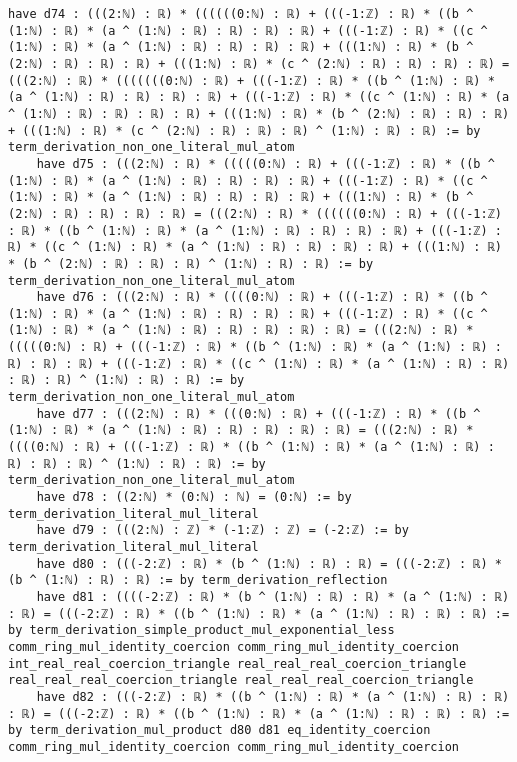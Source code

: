 \documentclass{article}
\begin{document}
\begin{tcolorbox}[colback=white!10, width=\linewidth]
\begin{lstlisting}[language=Lean4]
    have d74 : (((2:ℕ) : ℝ) * ((((((0:ℕ) : ℝ) + (((-1:ℤ) : ℝ) * ((b ^ (1:ℕ) : ℝ) * (a ^ (1:ℕ) : ℝ) : ℝ) : ℝ) : ℝ) + (((-1:ℤ) : ℝ) * ((c ^ (1:ℕ) : ℝ) * (a ^ (1:ℕ) : ℝ) : ℝ) : ℝ) : ℝ) + (((1:ℕ) : ℝ) * (b ^ (2:ℕ) : ℝ) : ℝ) : ℝ) + (((1:ℕ) : ℝ) * (c ^ (2:ℕ) : ℝ) : ℝ) : ℝ) : ℝ) = (((2:ℕ) : ℝ) * (((((((0:ℕ) : ℝ) + (((-1:ℤ) : ℝ) * ((b ^ (1:ℕ) : ℝ) * (a ^ (1:ℕ) : ℝ) : ℝ) : ℝ) : ℝ) + (((-1:ℤ) : ℝ) * ((c ^ (1:ℕ) : ℝ) * (a ^ (1:ℕ) : ℝ) : ℝ) : ℝ) : ℝ) + (((1:ℕ) : ℝ) * (b ^ (2:ℕ) : ℝ) : ℝ) : ℝ) + (((1:ℕ) : ℝ) * (c ^ (2:ℕ) : ℝ) : ℝ) : ℝ) ^ (1:ℕ) : ℝ) : ℝ) := by term_derivation_non_one_literal_mul_atom
    have d75 : (((2:ℕ) : ℝ) * (((((0:ℕ) : ℝ) + (((-1:ℤ) : ℝ) * ((b ^ (1:ℕ) : ℝ) * (a ^ (1:ℕ) : ℝ) : ℝ) : ℝ) : ℝ) + (((-1:ℤ) : ℝ) * ((c ^ (1:ℕ) : ℝ) * (a ^ (1:ℕ) : ℝ) : ℝ) : ℝ) : ℝ) + (((1:ℕ) : ℝ) * (b ^ (2:ℕ) : ℝ) : ℝ) : ℝ) : ℝ) = (((2:ℕ) : ℝ) * ((((((0:ℕ) : ℝ) + (((-1:ℤ) : ℝ) * ((b ^ (1:ℕ) : ℝ) * (a ^ (1:ℕ) : ℝ) : ℝ) : ℝ) : ℝ) + (((-1:ℤ) : ℝ) * ((c ^ (1:ℕ) : ℝ) * (a ^ (1:ℕ) : ℝ) : ℝ) : ℝ) : ℝ) + (((1:ℕ) : ℝ) * (b ^ (2:ℕ) : ℝ) : ℝ) : ℝ) ^ (1:ℕ) : ℝ) : ℝ) := by term_derivation_non_one_literal_mul_atom
    have d76 : (((2:ℕ) : ℝ) * ((((0:ℕ) : ℝ) + (((-1:ℤ) : ℝ) * ((b ^ (1:ℕ) : ℝ) * (a ^ (1:ℕ) : ℝ) : ℝ) : ℝ) : ℝ) + (((-1:ℤ) : ℝ) * ((c ^ (1:ℕ) : ℝ) * (a ^ (1:ℕ) : ℝ) : ℝ) : ℝ) : ℝ) : ℝ) = (((2:ℕ) : ℝ) * (((((0:ℕ) : ℝ) + (((-1:ℤ) : ℝ) * ((b ^ (1:ℕ) : ℝ) * (a ^ (1:ℕ) : ℝ) : ℝ) : ℝ) : ℝ) + (((-1:ℤ) : ℝ) * ((c ^ (1:ℕ) : ℝ) * (a ^ (1:ℕ) : ℝ) : ℝ) : ℝ) : ℝ) ^ (1:ℕ) : ℝ) : ℝ) := by term_derivation_non_one_literal_mul_atom
    have d77 : (((2:ℕ) : ℝ) * (((0:ℕ) : ℝ) + (((-1:ℤ) : ℝ) * ((b ^ (1:ℕ) : ℝ) * (a ^ (1:ℕ) : ℝ) : ℝ) : ℝ) : ℝ) : ℝ) = (((2:ℕ) : ℝ) * ((((0:ℕ) : ℝ) + (((-1:ℤ) : ℝ) * ((b ^ (1:ℕ) : ℝ) * (a ^ (1:ℕ) : ℝ) : ℝ) : ℝ) : ℝ) ^ (1:ℕ) : ℝ) : ℝ) := by term_derivation_non_one_literal_mul_atom
    have d78 : ((2:ℕ) * (0:ℕ) : ℕ) = (0:ℕ) := by term_derivation_literal_mul_literal
    have d79 : (((2:ℕ) : ℤ) * (-1:ℤ) : ℤ) = (-2:ℤ) := by term_derivation_literal_mul_literal
    have d80 : (((-2:ℤ) : ℝ) * (b ^ (1:ℕ) : ℝ) : ℝ) = (((-2:ℤ) : ℝ) * (b ^ (1:ℕ) : ℝ) : ℝ) := by term_derivation_reflection
    have d81 : ((((-2:ℤ) : ℝ) * (b ^ (1:ℕ) : ℝ) : ℝ) * (a ^ (1:ℕ) : ℝ) : ℝ) = (((-2:ℤ) : ℝ) * ((b ^ (1:ℕ) : ℝ) * (a ^ (1:ℕ) : ℝ) : ℝ) : ℝ) := by term_derivation_simple_product_mul_exponential_less comm_ring_mul_identity_coercion comm_ring_mul_identity_coercion int_real_real_coercion_triangle real_real_real_coercion_triangle real_real_real_coercion_triangle real_real_real_coercion_triangle
    have d82 : (((-2:ℤ) : ℝ) * ((b ^ (1:ℕ) : ℝ) * (a ^ (1:ℕ) : ℝ) : ℝ) : ℝ) = (((-2:ℤ) : ℝ) * ((b ^ (1:ℕ) : ℝ) * (a ^ (1:ℕ) : ℝ) : ℝ) : ℝ) := by term_derivation_mul_product d80 d81 eq_identity_coercion comm_ring_mul_identity_coercion comm_ring_mul_identity_coercion

\end{lstlisting}
\end{tcolorbox}
\end{document}
